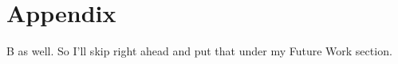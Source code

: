 \chapter*{Appendix}

B as well. So I'll skip right ahead and put that under my Future Work section.


